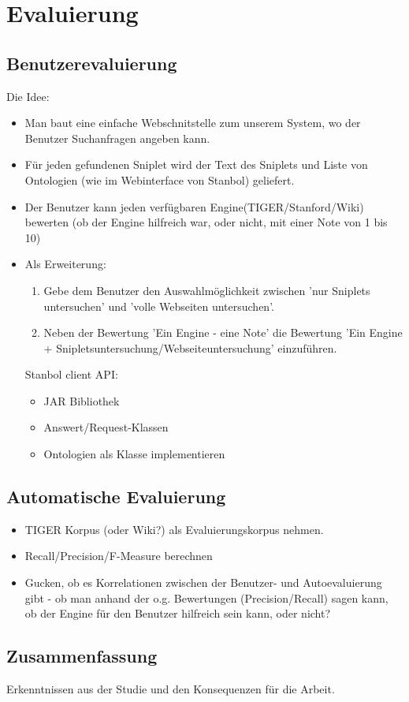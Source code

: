\chapter{Evaluierung}

\section{Benutzerevaluierung}
Die Idee:
\begin{itemize}
\item Man baut eine einfache Webschnitstelle zum unserem System, wo der Benutzer Suchanfragen angeben kann.
\item Für jeden gefundenen Sniplet wird der Text des Sniplets und Liste von Ontologien (wie im Webinterface von Stanbol) geliefert.
\item Der Benutzer kann jeden verfügbaren Engine(TIGER/Stanford/Wiki) bewerten (ob der Engine hilfreich war, oder nicht, mit einer Note von 1 bis 10)
\item Als Erweiterung:
\begin{enumerate}
\item Gebe dem Benutzer den Auswahlmöglichkeit zwischen 'nur Sniplets untersuchen' und 'volle Webseiten untersuchen'.
\item Neben der Bewertung 'Ein Engine - eine Note' die Bewertung 'Ein Engine + Snipletsuntersuchung/Webseiteuntersuchung' einzuführen.
\end{enumerate}

Stanbol client API:
\begin{itemize}
\item JAR Bibliothek
\item Answert/Request-Klassen 
\item Ontologien als Klasse implementieren
\end{itemize}
\end{itemize}

\section{Automatische Evaluierung}
\begin{itemize}
\item TIGER Korpus (oder Wiki?) als Evaluierungskorpus nehmen.
\item Recall/Precision/F-Measure berechnen
\item Gucken, ob es Korrelationen zwischen der Benutzer- und Autoevaluierung gibt - ob man anhand der o.g. Bewertungen (Precision/Recall) sagen kann, ob der Engine für den Benutzer hilfreich sein kann, oder nicht?
\end{itemize}

\section{Zusammenfassung}
Erkenntnissen aus der Studie und den Konsequenzen für die Arbeit.